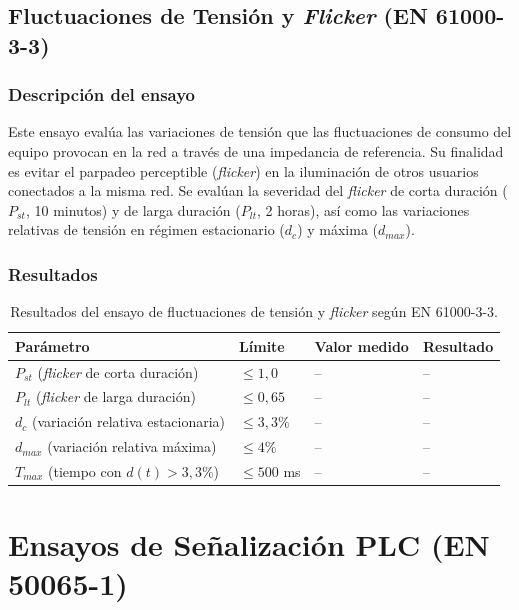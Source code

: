 \subsection{Fluctuaciones de Tensión y \textit{Flicker} (EN 61000-3-3)}
\label{subsec:flicker}

\subsubsection*{Descripción del ensayo}

Este ensayo evalúa las variaciones de tensión que las fluctuaciones de consumo del equipo provocan en la red a través de una impedancia de referencia. Su finalidad es evitar el parpadeo perceptible (\textit{flicker}) en la iluminación de otros usuarios conectados a la misma red. Se evalúan la severidad del \textit{flicker} de corta duración ($P_{st}$, 10 minutos) y de larga duración ($P_{lt}$, 2 horas), así como las variaciones relativas de tensión en régimen estacionario ($d_c$) y máxima ($d_{max}$).

\subsubsection*{Resultados}

\begin{table}[!h]
\centering
\small
\begin{tabular}{|p{5.8cm}|p{2.6cm}|p{2.6cm}|p{2.2cm}|}
\hline
\textbf{Parámetro} & \textbf{Límite} & \textbf{Valor medido} & \textbf{Resultado} \\ \hline
$P_{st}$ (\textit{flicker} de corta duración) & $\leq 1,0$ & -- & -- \\ \hline
$P_{lt}$ (\textit{flicker} de larga duración) & $\leq 0,65$ & -- & -- \\ \hline
$d_c$ (variación relativa estacionaria) & $\leq 3,3\%$ & -- & -- \\ \hline
$d_{max}$ (variación relativa máxima) & $\leq 4\%$ & -- & -- \\ \hline
$T_{max}$ (tiempo con $d(t) > 3,3\%$) & $\leq 500$ ms & -- & -- \\ \hline
\end{tabular}
\caption{Resultados del ensayo de fluctuaciones de tensión y \textit{flicker} según EN 61000-3-3.}
\label{tab:resultados_flicker}
\end{table}

\section{Ensayos de Señalización PLC (EN 50065-1)}
\label{sec:ensayos_plc}

